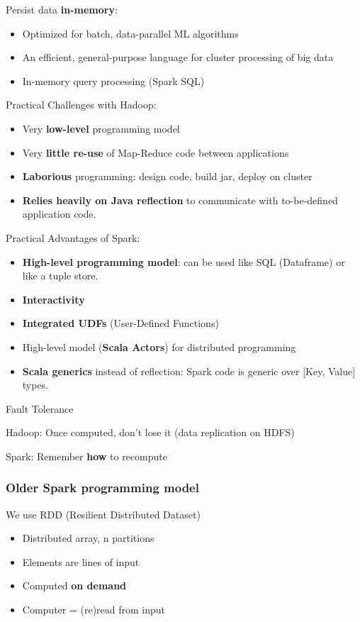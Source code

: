 Persist data {\bf in-memory}:
\begin{itemize}
 \item Optimized for batch, data-parallel ML algorithms
 \item An efficient, general-purpose language for cluster processing of big data
 \item In-memory query processing (Spark SQL)
\end{itemize}

Practical Challenges with Hadoop:
\begin{itemize}
 \item Very {\bf low-level} programming model
 \item Very {\bf little re-use} of Map-Reduce code between applications
 \item {\bf Laborious} programming: design code, build jar, deploy on cluster
 \item {\bf Relies heavily on Java reflection} to communicate with to-be-defined application code.
\end{itemize}

Practical Advantages of Spark:
\begin{itemize}
 \item {\bf High-level programming model}: can be used like SQL (Dataframe) or like a tuple store.
 \item {\bf Interactivity}
 \item {\bf Integrated UDFs} (User-Defined Functions)
 \item High-level model ({\bf Scala Actors}) for distributed programming
 \item {\bf Scala generics} instead of reflection: Spark code is generic over [Key, Value] types.
\end{itemize}

Fault Tolerance

Hadoop: Once computed, don't lose it (data replication on HDFS)

Spark: Remember {\bf how} to recompute

\subsubsection{Older Spark programming model}

We use RDD (Resilient Distributed Dataset)
\begin{itemize}
 \item Distributed array, n partitions
 \item Elements are lines of input
 \item Computed {\bf on demand}
 \item Computer = (re)read from input
\end{itemize}

